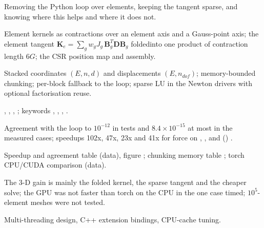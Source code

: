 \begin{description}[style=nextline,leftmargin=1em]
\item[Focus] Removing the Python loop over elements, keeping the tangent sparse, and knowing where this helps and where it does not.
\item[Mathematics] Element kernels as contractions over an element axis and a Gauss-point axis; the element tangent $\bm K_e=\sum_g w_g J_g\,\bm B_g^T\bm D\bm B_g$ folded\linebreak into one product of contraction length $6G$; the CSR position map and  assembly.
\item[Algorithm] Stacked coordinates $(E,n,d)$ and displacements $(E,n_{dof})$; memory-bounded chunking; per-block fallback to the loop; sparse LU in the Newton drivers with optional factorisation reuse.
\item[Implementation] , , , ; keywords , , , .
\item[Verification] Agreement with the loop to $10^{-12}$ in tests and $8.4\times10^{-15}$ at most in the measured cases; speedups 102x, 47x, 23x and 41x for force on , ,  and  () \have{}.
\item[Figures and tables] Speedup and agreement table \have{} (data), figure ; chunking memory table ; torch CPU/CUDA comparison \have{} (data).
\item[Honest limits] The 3-D gain is mainly the folded kernel, the sparse tangent and the cheaper solve; the GPU was not faster than torch on the CPU in the one case timed; $10^5$-element meshes were not tested.
\item[Exclusions] Multi-threading design, C++ extension bindings, CPU-cache tuning.
\end{description}


